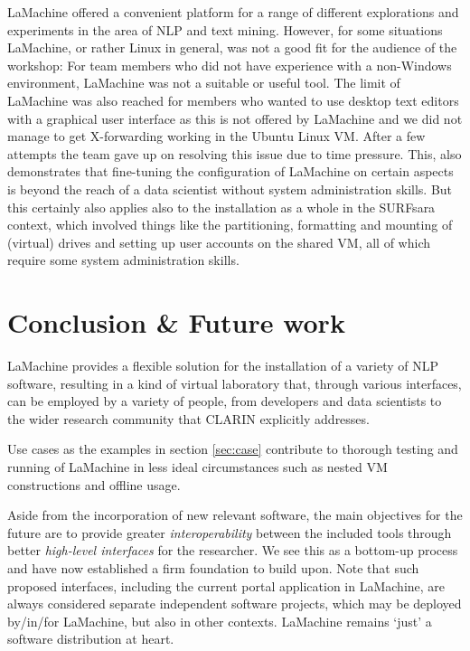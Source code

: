 \documentclass[a4paper,11pt]{article}
\begin{document}
LaMachine offered a convenient platform for a range of different explorations and experiments in the area of NLP and
text mining.  However, for some situations LaMachine, or rather Linux in general, was not a good fit for the audience of
the workshop: For team members who did not have experience with a non-Windows environment, LaMachine was not a suitable
or useful tool. The limit of LaMachine was also reached for members who wanted to use desktop text editors with a
graphical user interface as this is not offered by LaMachine and we did not manage to get X-forwarding working in the
Ubuntu Linux VM. After a few attempts the team gave up on resolving this issue due to time pressure. This, also
demonstrates that fine-tuning the configuration of LaMachine on certain aspects is beyond the reach of a data scientist
without system administration skills. But this certainly also applies also to the installation as a whole in the
SURFsara context, which involved things like the partitioning, formatting and mounting of (virtual) drives and setting
up user accounts on the shared VM, all of which require some system administration skills.

\section{Conclusion \& Future work}

LaMachine provides a flexible solution for the installation of a variety of NLP software, resulting in a kind
of virtual laboratory that, through various interfaces, can be employed by a variety of people, from developers and data
scientists to the wider research community that CLARIN explicitly addresses.

Use cases as the examples in section \ref{sec:case} contribute to thorough testing and running of LaMachine in less ideal
circumstances such as nested VM constructions and offline usage.

Aside from the incorporation of new relevant software, the main objectives for the future are to provide
greater \emph{interoperability} between the included tools through better \emph{high-level interfaces} for the
researcher. We see this as a bottom-up process and have now established a firm foundation to build upon. Note that such
proposed interfaces, including the current portal application in LaMachine, are always considered separate independent
software projects, which may be deployed by/in/for LaMachine, but also in other contexts. LaMachine remains `just'
a software distribution at heart.
\end{document}
